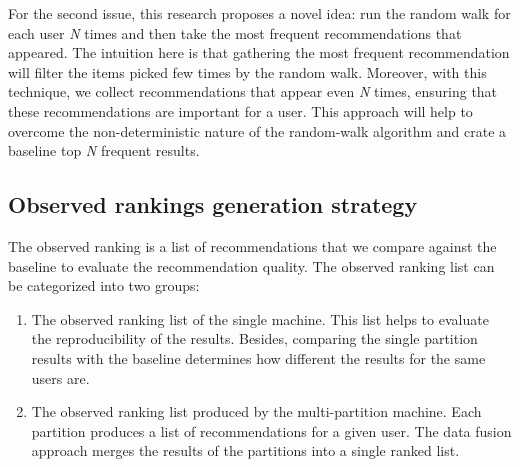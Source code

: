 For the second issue, this research proposes a novel idea: run the random walk for each user \emph{N} times and then take the most frequent recommendations that appeared. The intuition here is that gathering the most frequent recommendation will filter the items picked few times by the random walk. Moreover, with this technique, we collect recommendations that appear even \emph{N} times, ensuring that these recommendations are important for a user. This approach will help to overcome the non-deterministic nature of the random-walk algorithm and crate a baseline top \emph{N} frequent results.


\subsection{Observed rankings generation strategy}
\label{subsec:comparing-recommendtions}
The observed ranking is a list of recommendations that we compare against the baseline to evaluate the recommendation quality. The observed ranking list can be categorized into two groups:

\begin{enumerate}
    \item The observed ranking list of the single machine. This list helps to evaluate the reproducibility of the results. Besides, comparing the single partition results with the baseline determines how different the results for the same users are. 
    
    \item The observed ranking list produced by the multi-partition machine. Each partition produces a list of recommendations for a given user. The data fusion approach merges the results of the partitions into a single ranked list. 
\end{enumerate}
